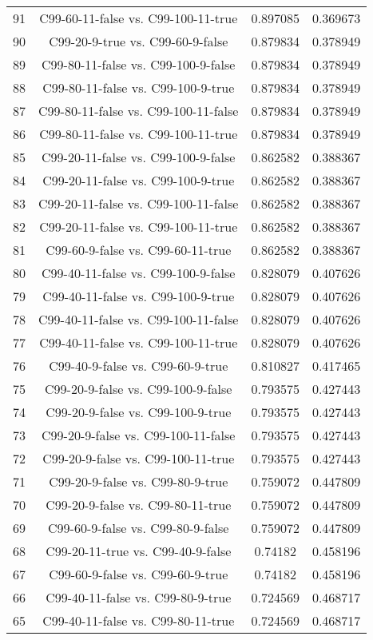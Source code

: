 \documentclass[a4paper,10pt]{article}
\begin{document}
\begin{landscape}
\begin{table}[!htp]
\begin{tabular}{cccc}
91&C99-60-11-false vs. C99-100-11-true&0.897085&0.369673\\
90&C99-20-9-true vs. C99-60-9-false&0.879834&0.378949\\
89&C99-80-11-false vs. C99-100-9-false&0.879834&0.378949\\
88&C99-80-11-false vs. C99-100-9-true&0.879834&0.378949\\
87&C99-80-11-false vs. C99-100-11-false&0.879834&0.378949\\
86&C99-80-11-false vs. C99-100-11-true&0.879834&0.378949\\
85&C99-20-11-false vs. C99-100-9-false&0.862582&0.388367\\
84&C99-20-11-false vs. C99-100-9-true&0.862582&0.388367\\
83&C99-20-11-false vs. C99-100-11-false&0.862582&0.388367\\
82&C99-20-11-false vs. C99-100-11-true&0.862582&0.388367\\
81&C99-60-9-false vs. C99-60-11-true&0.862582&0.388367\\
80&C99-40-11-false vs. C99-100-9-false&0.828079&0.407626\\
79&C99-40-11-false vs. C99-100-9-true&0.828079&0.407626\\
78&C99-40-11-false vs. C99-100-11-false&0.828079&0.407626\\
77&C99-40-11-false vs. C99-100-11-true&0.828079&0.407626\\
76&C99-40-9-false vs. C99-60-9-true&0.810827&0.417465\\
75&C99-20-9-false vs. C99-100-9-false&0.793575&0.427443\\
74&C99-20-9-false vs. C99-100-9-true&0.793575&0.427443\\
73&C99-20-9-false vs. C99-100-11-false&0.793575&0.427443\\
72&C99-20-9-false vs. C99-100-11-true&0.793575&0.427443\\
71&C99-20-9-false vs. C99-80-9-true&0.759072&0.447809\\
70&C99-20-9-false vs. C99-80-11-true&0.759072&0.447809\\
69&C99-60-9-false vs. C99-80-9-false&0.759072&0.447809\\
68&C99-20-11-true vs. C99-40-9-false&0.74182&0.458196\\
67&C99-60-9-false vs. C99-60-9-true&0.74182&0.458196\\
66&C99-40-11-false vs. C99-80-9-true&0.724569&0.468717\\
65&C99-40-11-false vs. C99-80-11-true&0.724569&0.468717\\

\end{tabular}
\end{table}
\end{landscape}
\end{document}

